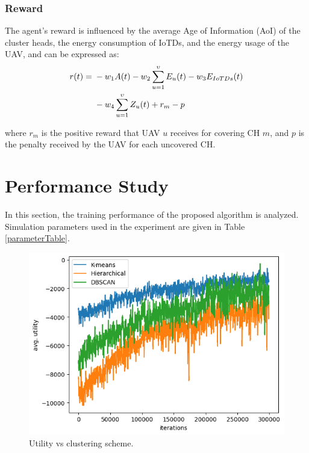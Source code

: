 \documentclass[conference]{IEEEtran}
\begin{document}
\subsubsection{Reward}
The agent's reward is influenced by the average Age of Information (AoI) of the cluster heads, the energy consumption of IoTDs, and the energy usage of the UAV, and can be expressed as:
\begin{align}
    r(t) =\; & -w_1A(t) - w_2\sum_{u=1}^\upsilon E_{u}(t) - w_3E_{IoTDs}(t) \notag \\
             & - w_4\sum_{u=1}^\upsilon Z_{u}(t) + r_m - p
\end{align}

where $r_m$ is the positive reward that UAV $u$ receives for covering CH $m$, and $p$ is the penalty received by the UAV for each uncovered CH.


\section{Performance Study}
In this section, the training performance of the proposed algorithm is analyzed.
Simulation parameters used in the experiment are given in Table \ref{parameterTable}.

\begin{figure}[htbp]
\centerline{\includegraphics[trim=10 0 0 0, clip,width=1\columnwidth]{utilityVSclustering.png}}
\caption{Utility vs clustering scheme.}
\label{c1}
\end{figure}
\end{document}
